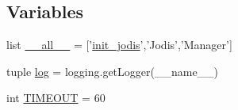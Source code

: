 \subsection*{\-Variables}
\begin{DoxyCompactItemize}
\item 
list \hyperlink{namespacecyberweb_1_1lib_1_1jodis_aeaa783d21eacd62ebe525540b17b3146}{\-\_\-\-\_\-all\-\_\-\-\_\-} = \mbox{[}'\hyperlink{namespacecyberweb_1_1lib_1_1jodis_a41a7241e1b04a3a6b9d4e48267063ebd}{init\-\_\-jodis}','\-Jodis','\-Manager'\mbox{]}
\item 
tuple \hyperlink{namespacecyberweb_1_1lib_1_1jodis_aef28175cdd4cacff25a0116945c4026a}{log} = logging.\-get\-Logger(\-\_\-\-\_\-name\-\_\-\-\_\-)
\item 
int \hyperlink{namespacecyberweb_1_1lib_1_1jodis_a973a4a9b053ac2d06a201807191a553b}{\-T\-I\-M\-E\-O\-U\-T} = 60
\end{DoxyCompactItemize}


